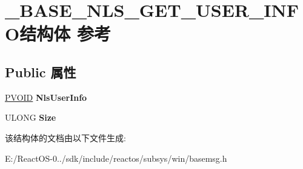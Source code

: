 \hypertarget{struct___b_a_s_e___n_l_s___g_e_t___u_s_e_r___i_n_f_o}{}\section{\+\_\+\+B\+A\+S\+E\+\_\+\+N\+L\+S\+\_\+\+G\+E\+T\+\_\+\+U\+S\+E\+R\+\_\+\+I\+N\+F\+O结构体 参考}
\label{struct___b_a_s_e___n_l_s___g_e_t___u_s_e_r___i_n_f_o}
\subsection*{Public 属性}
\begin{DoxyCompactItemize}
\item 
\mbox{\label{struct___b_a_s_e___n_l_s___g_e_t___u_s_e_r___i_n_f_o_a949038a113639afbe94cb172ffff968e}} 
\hyperlink{interfacevoid}{P\+V\+O\+ID} {\bfseries Nls\+User\+Info}
\item 
\mbox{\label{struct___b_a_s_e___n_l_s___g_e_t___u_s_e_r___i_n_f_o_ac4800b5dfd079a8cca41e825beccfbba}} 
U\+L\+O\+NG {\bfseries Size}
\end{DoxyCompactItemize}


该结构体的文档由以下文件生成\+:\begin{DoxyCompactItemize}
\item 
E\+:/\+React\+O\+S-\/0../sdk/include/reactos/subsys/win/basemsg.\+h\end{DoxyCompactItemize}
